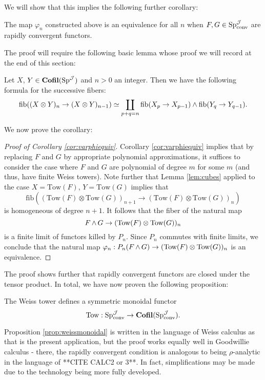 We will show that this implies the following further corollary:

\begin{cor}\label{cor:varphiequiv}
The map $\varphi_n$ constructed above is an equivalence for all $n$ when $F,G\in \operatorname{\mathrm{Sp}}^{\operatorname{\mathcal{J}}}_{\text{conv}}$ are rapidly convergent functors.  
\end{cor}
The proof will require the following basic lemma whose proof we will record at the end of this section: 
\begin{lem}\label{lem:cubes}
Let $X$, $Y \in \operatorname{\mathbf{Cofil}}(\operatorname{\mathrm{Sp}}^{\operatorname{\mathcal{J}}})$ and $n>0$ an integer.  Then we have the following formula for the successive fibers: $$\operatorname{\mathrm{fib}} ((X\otimes Y)_{n} \to (X\otimes Y)_{n-1}) \simeq \coprod_{p+q=n} \operatorname{\mathrm{fib}} (X_p\to X_{p-1}) \wedge \operatorname{\mathrm{fib}} (Y_q \to Y_{q-1}).$$
\end{lem}

We now prove the corollary:

\begin{proof}[Proof of Corollary \ref{cor:varphiequiv}]
Corollary \ref{cor:varphiequiv} implies that by replacing $F$ and $G$ by appropriate polynomial approximations, it suffices to consider the case where $F$ and $G$ are polynomial of degree $m$ for some $m$ (and thus, have finite Weiss towers).   Note further that Lemma \ref{lem:cubes} applied to the case $X = \text{Tow}(F)$, $Y=\text{Tow}(G)$ implies that $$\text{fib}((\text{Tow}(F)\otimes \text{Tow}(G) )_{n+1} \to (\text{Tow}(F) \otimes \text{Tow}(G))_n)$$ is homogeneous of degree $n+1$.  It follows that the fiber of the natural map $$F\operatorname{\wedge} G \to (\text{Tow}(F)\otimes \text{Tow}(G))_n$$  is a finite limit of functors killed by $P_n$.  Since $P_n$ commutes with finite limits, we conclude that the natural map $\varphi_n: P_n(F\operatorname{\wedge} G)\to (\text{Tow}(F)\otimes \text{Tow}(G))_n$ is an equivalence.  
\end{proof}

The proof shows further that rapidly convergent functors are closed under the tensor product.  In total, we have now proven the following proposition:

\begin{prop}\label{prop:weissmonoidal}
The Weiss tower defines a symmetric monoidal functor $$\text{Tow}: \operatorname{\mathrm{Sp}}^{\operatorname{\mathcal{J}}}_{\text{conv}} \to \operatorname{\mathbf{Cofil}}(\operatorname{\mathrm{Sp}}^{\operatorname{\mathcal{J}}}_{\text{conv}}).$$
\end{prop}
\begin{rmk}
Proposition \ref{prop:weissmonoidal} is written in the language of Weiss calculus as that is the present application, but the proof works equally well in Goodwillie calculus - there, the rapidly convergent condition is analogous to being $\rho$-analytic in the language of **CITE CALC2 or 3**.  In fact, simplifications may be made due to the technology being more fully developed.  
\end{rmk}

